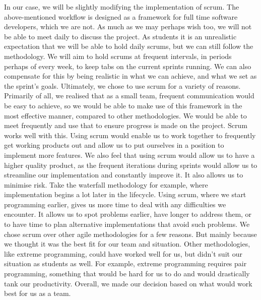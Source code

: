 In our case, we will be slightly modifying the implementation of scrum. The above-mentioned workflow is designed as a framework for full time software developers, which we are not. As much as we may perhaps wish too, we will not be able to meet daily to discuss the project. As students it is an unrealistic expectation that we will be able to hold daily scrums, but we can still follow the methodology. We will aim to hold scrums at frequent intervals, in periods perhaps of every week, to keep tabs on the current sprints running. We can also compensate for this by being realistic in what we can achieve, and what we set as the sprint’s goals. 
Ultimately, we chose to use scrum for a variety of reasons. Primarily of all, we realised that as a small team, frequent communication would be easy to achieve, so we would be able to make use of this framework in the most effective manner, compared to other methodologies. We would be able to meet frequently and use that to ensure progress is made on the project. Scrum works well with this. Using scrum would enable us to work together to frequently get working products out and allow us to put ourselves in a position to implement more features. We also feel that using scrum would allow us to have a higher quality product, as the frequent iterations during sprints would allow us to streamline our implementation and constantly improve it. It also allows us to minimise risk. Take the waterfall methodology for example, where implementation begins a lot later in the lifecycle. Using scrum, where we start programming earlier, gives us more time to deal with any difficulties we encounter. It allows us to spot problems earlier, have longer to address them, or to have time to plan alternative implementations that avoid such problems. 
We chose scrum over other agile methodologies for a few reasons. But mainly because we thought it was the best fit for our team and situation. Other methodologies, like extreme programming, could have worked well for us, but didn’t suit our situation as students as well. For example, extreme programming requires pair programming, something that would be hard for us to do and would drastically tank our productivity. Overall, we made our decision based on what would work best for us as a team.

    
